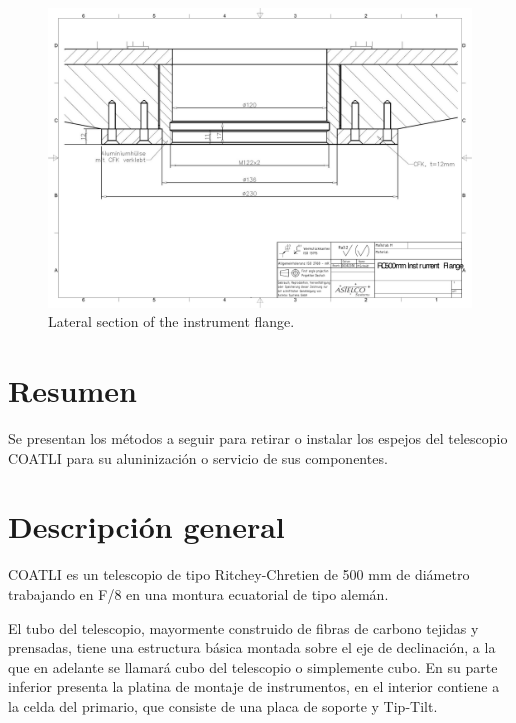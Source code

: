 \begin{figure}
\begin{center}
\includegraphics[height=1.0\linewidth,angle=90]{figures/telescope-instrument-flange-section.pdf}
\end{center}
\caption{Lateral section of the instrument flange.}
\label{figure:telescope-plans-last}
\end{figure}



\section{Resumen}

Se presentan los métodos a seguir para retirar o instalar los espejos del telescopio COATLI para su aluninización o servicio de sus componentes.

\section{Descripción general}

COATLI es un telescopio de tipo Ritchey-Chretien de 500 mm de diámetro trabajando en F/8 en una montura ecuatorial de tipo alemán.

El tubo del telescopio, mayormente construido de fibras de carbono tejidas y prensadas, tiene una estructura básica montada sobre el eje de declinación, a la que en adelante se llamará cubo del telescopio o simplemente cubo. En su parte inferior presenta la platina de montaje de instrumentos, en el interior contiene a la celda del primario, que consiste de una placa de soporte y Tip-Tilt. 

